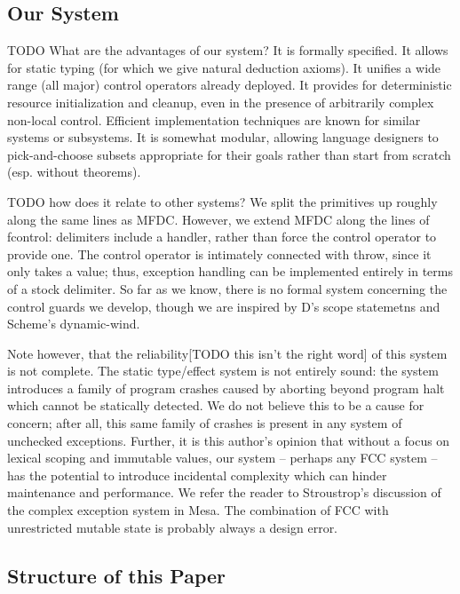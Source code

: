 \documentclass[11pt]{article}
\begin{document}
\subsection{Our System}

TODO What are the advantages of our system?
It is formally specified.
It allows for static typing (for which we give natural deduction axioms).
It unifies a wide range (all major) control operators already deployed.
It provides for deterministic resource initialization and cleanup, even in the presence of arbitrarily complex non-local control.
Efficient implementation techniques are known for similar systems or subsystems.
It is somewhat modular, allowing language designers to pick-and-choose subsets appropriate for their goals rather than start from scratch (esp. without theorems).

TODO how does it relate to other systems?
We split the primitives up roughly along the same lines as MFDC.
However, we extend MFDC along the lines of fcontrol: delimiters include a handler, rather than force the control operator to provide one.
The control operator is intimately connected with throw, since it only takes a value; thus, exception handling can be implemented entirely in terms of a stock delimiter.
So far as we know, there is no formal system concerning the control guards we develop, though we are inspired by D's scope statemetns and Scheme's dynamic-wind. 

Note however, that the reliability[TODO this isn't the right word] of this system is not complete.
The static type/effect system is not entirely sound: the system introduces a family of program crashes caused by aborting beyond program halt which cannot be statically detected.
We do not believe this to be a cause for concern; after all, this same family of crashes is present in any system of unchecked exceptions.
Further, it is this author's opinion that without a focus on lexical scoping and immutable values, our system -- perhaps any FCC system -- has the potential to introduce incidental complexity which can hinder maintenance and performance.
We refer the reader to Stroustrop's discussion\cite{evolutionCplusplus} of the complex exception system in Mesa.
The combination of FCC with unrestricted mutable state is probably always a design error.

\subsection{Structure of this Paper}
\end{document}
